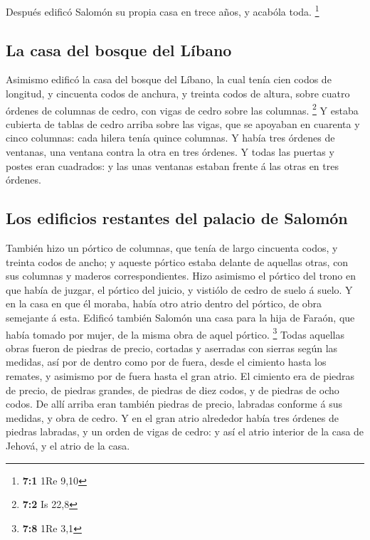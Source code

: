  Después edificó Salomón su propia casa en trece años, y
acabóla toda. \footnote{\textbf{7:1} 1Re 9,10}

\hypertarget{la-casa-del-bosque-del-luxedbano}{%
\subsection{La casa del bosque del
Líbano}\label{la-casa-del-bosque-del-luxedbano}}

 Asimismo edificó la casa del bosque del Líbano, la cual
tenía cien codos de longitud, y cincuenta codos de anchura, y treinta
codos de altura, sobre cuatro órdenes de columnas de cedro, con vigas de
cedro sobre las columnas. \footnote{\textbf{7:2} Is 22,8} 
Y estaba cubierta de tablas de cedro arriba sobre las vigas, que se
apoyaban en cuarenta y cinco columnas: cada hilera tenía quince
columnas.  Y había tres órdenes de ventanas, una ventana
contra la otra en tres órdenes.  Y todas las puertas y
postes eran cuadrados: y las unas ventanas estaban frente á las otras en
tres órdenes.

\hypertarget{los-edificios-restantes-del-palacio-de-salomuxf3n}{%
\subsection{Los edificios restantes del palacio de
Salomón}\label{los-edificios-restantes-del-palacio-de-salomuxf3n}}

 También hizo un pórtico de columnas, que tenía de largo
cincuenta codos, y treinta codos de ancho; y aqueste pórtico estaba
delante de aquellas otras, con sus columnas y maderos correspondientes.
 Hizo asimismo el pórtico del trono en que había de
juzgar, el pórtico del juicio, y vistiólo de cedro de suelo á suelo.
 Y en la casa en que él moraba, había otro atrio dentro
del pórtico, de obra semejante á esta. Edificó también Salomón una casa
para la hija de Faraón, que había tomado por mujer, de la misma obra de
aquel pórtico. \footnote{\textbf{7:8} 1Re 3,1}  Todas
aquellas obras fueron de piedras de precio, cortadas y aserradas con
sierras según las medidas, así por de dentro como por de fuera, desde el
cimiento hasta los remates, y asimismo por de fuera hasta el gran atrio.
 El cimiento era de piedras de precio, de piedras
grandes, de piedras de diez codos, y de piedras de ocho codos.
 De allí arriba eran también piedras de precio, labradas
conforme á sus medidas, y obra de cedro.  Y en el gran
atrio alrededor había tres órdenes de piedras labradas, y un orden de
vigas de cedro: y así el atrio interior de la casa de Jehová, y el atrio
de la casa.

